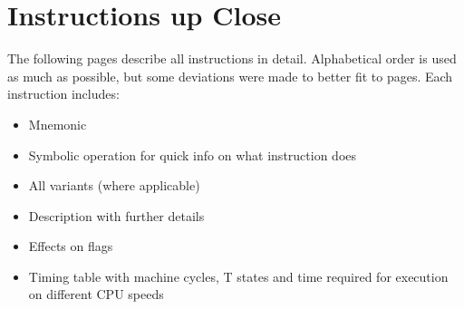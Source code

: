 \documentclass[12pt,twoside,openright,a4paper]{book}
\begin{document}
\fi


\chapter{Instructions up Close}
\label{instruction_details}


\newcommand{\DetailParityOverflow}[1]{
	\IfEqCase{#1}
	{
		{p}{
			\small
			\setlength{\unitlength}{0.2mm}
			\begin{picture}(20,10)
				\put(-5.6,7){\circle{20}}
				\put(-11,0){P}
				\put(4,0){V}
			\end{picture}
		}
		{v}{
			\small
			\setlength{\unitlength}{0.2mm}
			\begin{picture}(20,10)
				\put(11,7){\circle{20}}
				\put(-11,0){P}
				\put(4,0){V}
			\end{picture}
		}
		{}{PV}
	}
}
The following pages describe all instructions in detail. Alphabetical order is used as much as possible, but some deviations were made to better fit to pages. Each instruction includes:

\begin{itemize}
	\setlength\itemsep{1pt}
	\item Mnemonic
	\item Symbolic operation for quick info on what instruction does
	\item All variants (where applicable)
	\item Description with further details
	\item Effects on flags
	\item Timing table with machine cycles, T states and time required for execution on different CPU speeds
\end{itemize}
\end{document}
